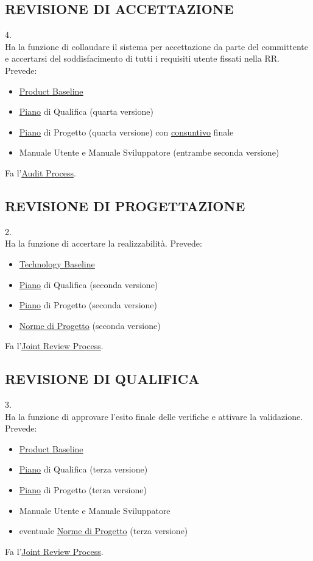 		\subsection{REVISIONE DI ACCETTAZIONE}  \label{RA}
		4. \\
		Ha la funzione di collaudare il sistema per accettazione da parte del committente e accertarsi del soddisfacimento di tutti i requisiti utente fissati nella RR.
		Prevede:
		\begin{itemize}
			\item \underline{\hyperref[productbaseline]{Product Baseline}}
			\item \underline{\hyperref[piano]{Piano}} di Qualifica (quarta versione)
			\item \underline{\hyperref[piano]{Piano}} di Progetto (quarta versione) con \underline{\hyperref[consuntivo]{consuntivo}} finale
			\item Manuale Utente e Manuale Sviluppatore (entrambe seconda versione)
		\end{itemize}
		Fa l'\underline{\hyperref[audit]{Audit Process}}.

		\subsection{REVISIONE DI PROGETTAZIONE}	 \label{RP}
		2. \\
		Ha la funzione di accertare la realizzabilità.
		Prevede:
		\begin{itemize}
			\item \underline{\hyperref[technologybaseline]{Technology Baseline}}
			\item \underline{\hyperref[piano]{Piano}} di Qualifica (seconda versione)
			\item \underline{\hyperref[piano]{Piano}} di Progetto (seconda versione)
			\item \underline{\hyperref[norme]{Norme di Progetto}} (seconda versione)
		\end{itemize}
		Fa l'\underline{\hyperref[joint]{Joint Review Process}}.

		\subsection{REVISIONE DI QUALIFICA}  \label{RQ}
		3. \\
		Ha la funzione di approvare l’esito finale delle verifiche e attivare la validazione.
		Prevede:
		\begin{itemize}
			\item \underline{\hyperref[productbaseline]{Product Baseline}}
			\item \underline{\hyperref[piano]{Piano}} di Qualifica (terza versione)
			\item \underline{\hyperref[piano]{Piano}} di Progetto (terza versione)
			\item Manuale Utente e Manuale Sviluppatore
			\item eventuale \underline{\hyperref[norme]{Norme di Progetto}} (terza versione)
		\end{itemize}
		Fa l'\underline{\hyperref[joint]{Joint Review Process}}.

